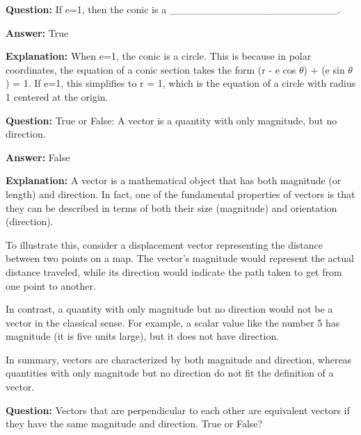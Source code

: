 \documentclass{article}
\begin{document}
                \vspace{0.5cm} 
        
            
                \textbf {Question:} If e=1, then the conic is a \_\_\_\_\_\_\_\_\_\_\_\_\_\_\_\_\_\_\_\_\_\_\_.
                
                \textbf{Answer:} True

                \textbf{Explanation:} When e=1, the conic is a circle. This is because in polar coordinates, the equation of a conic section takes the form (r - e cos \ensuremath{\theta}){\texttwosuperior} + (e sin \ensuremath{\theta}){\texttwosuperior} = 1. If e=1, this simplifies to r{\texttwosuperior} = 1, which is the equation of a circle with radius 1 centered at the origin.
                
                \vspace{0.5cm} 
        
            
                \textbf {Question:} True or False: A vector is a quantity with only magnitude, but no direction.
                
                \textbf{Answer:} False

                \textbf{Explanation:} A vector is a mathematical object that has both magnitude (or length) and direction. In fact, one of the fundamental properties of vectors is that they can be described in terms of both their size (magnitude) and orientation (direction).

To illustrate this, consider a displacement vector representing the distance between two points on a map. The vector's magnitude would represent the actual distance traveled, while its direction would indicate the path taken to get from one point to another.

In contrast, a quantity with only magnitude but no direction would not be a vector in the classical sense. For example, a scalar value like the number 5 has magnitude (it is five units large), but it does not have direction.

In summary, vectors are characterized by both magnitude and direction, whereas quantities with only magnitude but no direction do not fit the definition of a vector.
                
                \vspace{0.5cm} 
        
            
                \textbf {Question:} Vectors that are perpendicular to each other are equivalent vectors if they have the same magnitude and direction. True or False?
                
\end{document}

